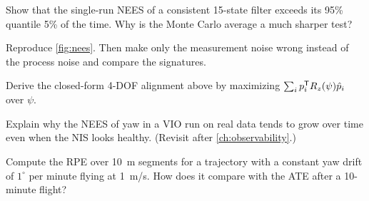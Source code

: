 \begin{exercises}
  \item Show that the single-run NEES of a consistent 15-state filter exceeds its 95\% quantile 5\% of the time. Why
        is the Monte Carlo average a much sharper test?
  \item Reproduce \cref{fig:nees}. Then make only the measurement noise wrong instead of the process noise and compare
        the signatures.
  \item Derive the closed-form 4-DOF alignment above by maximizing $\sum_i p_i^{\mathsf{T}} R_z(\psi)\hat p_i$ over $\psi$.
  \item Explain why the NEES of yaw in a VIO run on real data tends to grow over time even when the NIS looks
        healthy. (Revisit after \cref{ch:observability}.)
  \item Compute the RPE over 10~m segments for a trajectory with a constant yaw drift of $1^\circ$ per minute flying at
        1~m/s. How does it compare with the ATE after a 10-minute flight?
\end{exercises}

